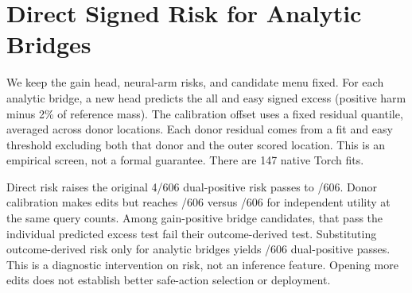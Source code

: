 \section{Direct Signed Risk for Analytic Bridges}
We keep the gain head, neural-arm risks, and candidate menu fixed.
For each analytic bridge, a new head predicts the all and easy signed
excess (positive harm minus 2\% of reference mass). The calibration
offset uses a fixed residual quantile, averaged across donor locations.
Each donor residual comes from a fit and easy threshold excluding both
that donor and the outer scored location. This is an empirical screen,
not a formal guarantee. There are 147 native Torch fits.

Direct risk raises the original 4/606 dual-positive risk passes to
\SignedBridgeDirect/606. Donor calibration makes \SignedBridgeEdits{}
edits but reaches \SignedBridgeCal/606 versus \SignedBridgeControl/606
for independent utility at the same query counts. Among gain-positive
bridge candidates, \SignedBridgeFalseAdmits{} that pass the individual
predicted excess test fail their outcome-derived test. Substituting
outcome-derived risk only for analytic bridges yields
\SignedBridgeOracle/606 dual-positive passes. This is a diagnostic
intervention on risk, not an inference feature. Opening more edits
does not establish better safe-action selection or deployment.
